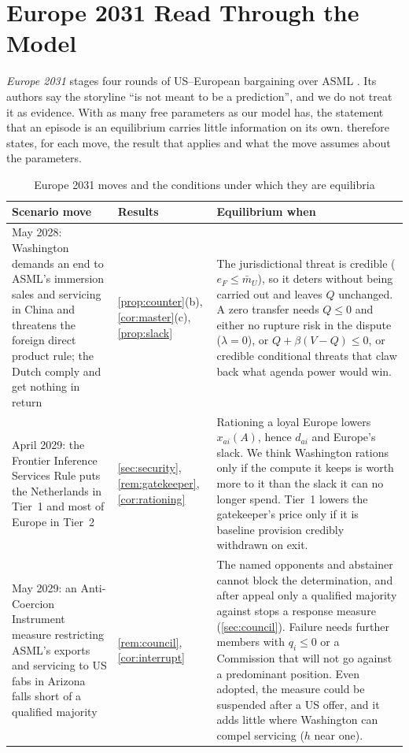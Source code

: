 \section{Europe 2031 Read Through the Model}\label{app:scenario}

\emph{Europe 2031} stages four rounds of US--European bargaining over ASML \citep{juijn2026europe}. Its authors say the storyline ``is not meant to be a prediction'', and we do not treat it as evidence. With as many free parameters as our model has, the statement that an episode is an equilibrium carries little information on its own.  therefore states, for each move, the result that applies and what the move assumes about the parameters.

\begin{table}[!tp]
\centering
\footnotesize
\caption{Europe 2031 moves and the conditions under which they are equilibria}\label{tab:scenario}
\begin{tabularx}{\textwidth}{@{}>{\raggedright\arraybackslash}p{3.6cm}>{\raggedright\arraybackslash}p{2.3cm}>{\raggedright\arraybackslash}X@{}}
\toprule
Scenario move & Results & Equilibrium when\\
\midrule
May 2028: Washington demands an end to ASML's immersion sales and servicing in China and threatens the foreign direct product rule; the Dutch comply and get nothing in return &
\cref{prop:counter}(b), \cref{cor:master}(c), \cref{prop:slack} &
The jurisdictional threat is credible ($e_F\le\bar m_U$), so it deters without being carried out and leaves $Q$ unchanged. A zero transfer needs $Q\le 0$ and either no rupture risk in the dispute ($\lambda=0$), or $Q+\beta(V-Q)\le 0$, or credible conditional threats that claw back what agenda power would win.\\
\addlinespace
April 2029: the Frontier Inference Services Rule puts the Netherlands in Tier~1 and most of Europe in Tier~2 &
\cref{sec:security}, \cref{rem:gatekeeper}, \cref{cor:rationing} &
Rationing a loyal Europe lowers $x_{ai}(A)$, hence $d_{ai}$ and Europe's slack. We think Washington rations only if the compute it keeps is worth more to it than the slack it can no longer spend. Tier~1 lowers the gatekeeper's price only if it is baseline provision credibly withdrawn on exit.\\
\addlinespace
May 2029: an Anti-Coercion Instrument measure restricting ASML's exports and servicing to US fabs in Arizona falls short of a qualified majority &
\cref{rem:council}, \cref{cor:interrupt} &
The named opponents and abstainer cannot block the determination, and after appeal only a qualified majority against stops a response measure (\cref{sec:council}). Failure needs further members with $q_i\le 0$ or a Commission that will not go against a predominant position. Even adopted, the measure could be suspended after a US offer, and it adds little where Washington can compel servicing ($h$ near one).\\

\end{tabularx}
\end{table}
